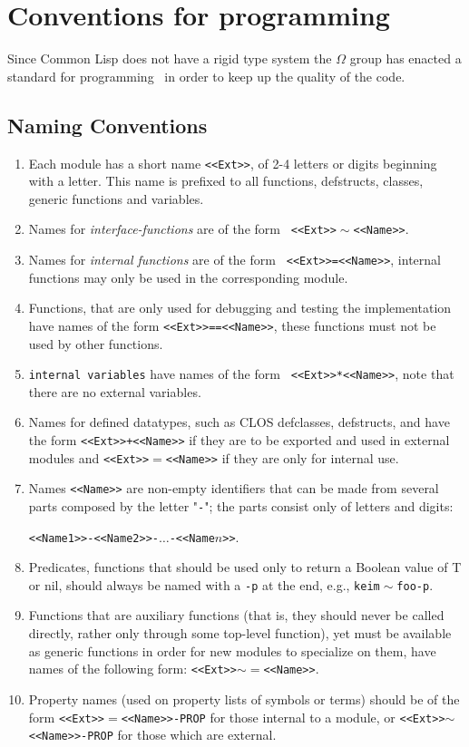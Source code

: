 \chapter{Conventions for programming \keim}

Since {\sc Common Lisp} does not have a rigid type system the $\Omega$ group has enacted a standard for
programming \keim\ in order to keep up the quality of the code.
\section{Naming Conventions}
\label{naming-conventions}
\begin{enumerate}
\item Each module has a short name  {\tt <<Ext>>}, of 2-4 letters or digits
beginning with a letter.
This name is prefixed to all functions, defstructs, classes, generic
functions and variables.
\item Names for {\em interface-functions} are of the form  {\tt
<<Ext>>${}\sim{}$<<Name>>}. 
\item Names for {\em internal functions} are of the form {\tt
<<Ext>>=<<Name>>}, internal functions may only be used in the
corresponding module.
\item Functions, that are only used for debugging and testing the implementation
have names of the form {\tt <<Ext>>==<<Name>>}, these functions
must not be used by other functions.
\item {\tt internal variables} have names of the form  {\tt
<<Ext>>*<<Name>>}, note that there are no external variables.
\item Names for defined datatypes, such as CLOS defclasses, defstructs, and
 have the form {\tt <<Ext>>+<<Name>>} if they are to be exported and used 
in external modules and {\tt <<Ext>>$=$<<Name>>} if they are only for internal
use.
\item Names {\tt <<Name>>} are non-empty identifiers that
can be made from several parts composed
by the letter "{\tt -}"; the parts consist only of letters and digits: 

{\tt <<Name1>>-<<Name2>>-$\ldots$-<<Name$n$>>}. 
\item Predicates, functions that should be used only to return a Boolean value
of T or nil, should always be named with a {\tt -p} at the end, e.g., 
{\tt keim${}\sim{}$foo-p}.
\item Functions that are auxiliary functions (that is, they should never be called
directly, rather only through some top-level function), yet must be available
as generic functions in order for new modules to specialize on them, have
names of the following form: {\tt <<Ext>>$\sim=$<<Name>>}.
\item Property names (used on property lists of symbols or terms) should be of the form {\tt <<Ext>>$=$<<Name>>-PROP} for those internal to a module, or
{\tt <<Ext>>$\sim$<<Name>>-PROP} for those which are external.
\end{enumerate}


